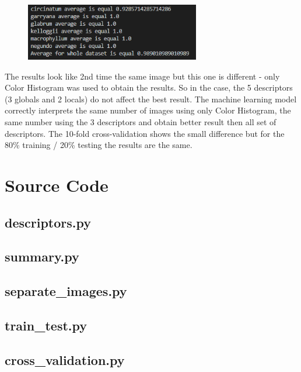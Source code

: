 \documentclass[12pt]{article}
\begin{document}
\begin{figure}[h!]
\centering
\includegraphics[width=3in]{results_histo.png}
\end{figure}

The results look like 2nd time the same image but this one is different - only Color Histogram was used to obtain the results. So in the case, the 5 descriptors (3 globals and 2 locals) do not affect the best result. The machine learning model correctly interprets the same number of images using only Color Histogram, the same number using the 3 descriptors and obtain better result then all set of descriptors. The 10-fold cross-validation shows the small difference but for the 80\% training / 20\% testing the results are the same.

\section{Source Code}

\subsection{descriptors.py}


\subsection{summary.py}


\subsection{separate\_images.py}


\subsection{train\_test.py}


\subsection{cross\_validation.py}

\end{document}
